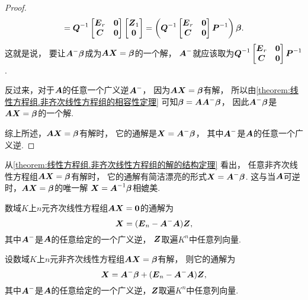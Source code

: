 \begin{theorem}[非齐次线性方程组的解的结构定理]
\begin{proof}
\begin{equation*}
	= \boldsymbol{Q}^{-1}
	\begin{bmatrix}
		\boldsymbol{E}_r & \boldsymbol0 \\
		\boldsymbol{C} & \boldsymbol0
	\end{bmatrix}
	\begin{bmatrix}
		\boldsymbol{Z}_1 \\
		\boldsymbol0
	\end{bmatrix}
	= \left(
		\boldsymbol{Q}^{-1}
		\begin{bmatrix}
			\boldsymbol{E}_r & \boldsymbol0 \\
			\boldsymbol{C} & \boldsymbol0
		\end{bmatrix}
		\boldsymbol{P}^{-1}
	\right)
	\boldsymbol\beta.
\end{equation*}
这就是说，
要让\(\boldsymbol{A}^- \boldsymbol\beta\)成为\(\boldsymbol{A} \boldsymbol{X} = \boldsymbol\beta\)的一个解，
\(\boldsymbol{A}^-\)就应该取为\(
	\boldsymbol{Q}^{-1}
	\begin{bmatrix}
		\boldsymbol{E}_r & \boldsymbol0 \\
		\boldsymbol{C} & \boldsymbol0
	\end{bmatrix}
	\boldsymbol{P}^{-1}
\).

反过来，对于\(\boldsymbol{A}\)的任意一个广义逆\(\boldsymbol{A}^-\)，
因为\(\boldsymbol{A} \boldsymbol{X} = \boldsymbol\beta\)有解，
所以由\cref{theorem:线性方程组.非齐次线性方程组的相容性定理}
可知\(\boldsymbol\beta = \boldsymbol{A} \boldsymbol{A}^- \boldsymbol\beta\)，
因此\(\boldsymbol{A}^- \boldsymbol\beta\)是\(\boldsymbol{A} \boldsymbol{X} = \boldsymbol\beta\)的一个解.

综上所述，\(\boldsymbol{A} \boldsymbol{X} = \boldsymbol\beta\)有解时，
它的通解是\(\boldsymbol{X} = \boldsymbol{A}^- \boldsymbol\beta\)，
其中\(\boldsymbol{A}^-\)是\(\boldsymbol{A}\)的任意一个广义逆.
\end{proof}
\end{theorem}
从\cref{theorem:线性方程组.非齐次线性方程组的解的结构定理} 看出，
任意非齐次线性方程组\(\boldsymbol{A} \boldsymbol{X} = \boldsymbol\beta\)有解时，
它的通解有简洁漂亮的形式\(\boldsymbol{X} = \boldsymbol{A}^- \boldsymbol\beta\).
这与当\(\boldsymbol{A}\)可逆时，\(\boldsymbol{A} \boldsymbol{X} = \boldsymbol\beta\)的唯一解
\(\boldsymbol{X} = \boldsymbol{A}^{-1} \boldsymbol\beta\)相媲美.

\begin{theorem}[齐次线性方程组的解的结构定理]\label{theorem:线性方程组.齐次线性方程组的解的结构定理}
数域\(K\)上\(n\)元齐次线性方程组\(\boldsymbol{A}\boldsymbol{X}=\boldsymbol0\)的通解为\begin{equation}\label{equation:线性方程组.齐次线性方程组的通解}
	\boldsymbol{X}=(\boldsymbol{E}_n - \boldsymbol{A}^- \boldsymbol{A}) \boldsymbol{Z},
\end{equation}
其中\(\boldsymbol{A}^-\)是\(\boldsymbol{A}\)的任意给定的一个广义逆，
\(\boldsymbol{Z}\)取遍\(K^n\)中任意列向量.
\end{theorem}

\begin{corollary}\label{theorem:线性方程组.齐次线性方程组的解的结构定理.推论1}
设数域\(K\)上\(n\)元非齐次线性方程组\(\boldsymbol{A} \boldsymbol{X} = \boldsymbol\beta\)有解，
则它的通解为\begin{equation}\label{equation:线性方程组.非齐次线性方程组的通解2}
	\boldsymbol{X} = \boldsymbol{A}^- \boldsymbol\beta + (\boldsymbol{E}_n - \boldsymbol{A}^- \boldsymbol{A}) \boldsymbol{Z},
\end{equation}
其中\(\boldsymbol{A}^-\)是\(\boldsymbol{A}\)的任意给定的一个广义逆，\(\boldsymbol{Z}\)取遍\(K^n\)中任意列向量.
\end{corollary}

